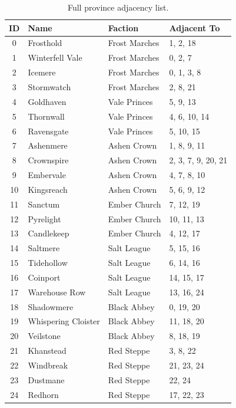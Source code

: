 \documentclass[a4paper, 11pt]{article}
\begin{document}
\begin{table}[htbp]
\centering
\caption{Full province adjacency list.}
\label{tab:adjacency}
\small
\begin{tabular}{@{}clll@{}}
\toprule
\textbf{ID} & \textbf{Name} & \textbf{Faction} & \textbf{Adjacent To} \\
\midrule
0  & Frosthold          & Frost Marches & 1, 2, 18 \\
1  & Winterfell Vale    & Frost Marches & 0, 2, 7 \\
2  & Icemere            & Frost Marches & 0, 1, 3, 8 \\
3  & Stormwatch         & Frost Marches & 2, 8, 21 \\
4  & Goldhaven          & Vale Princes  & 5, 9, 13 \\
5  & Thornwall          & Vale Princes  & 4, 6, 10, 14 \\
6  & Ravensgate         & Vale Princes  & 5, 10, 15 \\
7  & Ashenmere          & Ashen Crown   & 1, 8, 9, 11 \\
8  & Crownspire         & Ashen Crown   & 2, 3, 7, 9, 20, 21 \\
9  & Embervale          & Ashen Crown   & 4, 7, 8, 10 \\
10 & Kingsreach         & Ashen Crown   & 5, 6, 9, 12 \\
11 & Sanctum            & Ember Church  & 7, 12, 19 \\
12 & Pyrelight          & Ember Church  & 10, 11, 13 \\
13 & Candlekeep         & Ember Church  & 4, 12, 17 \\
14 & Saltmere           & Salt League   & 5, 15, 16 \\
15 & Tidehollow         & Salt League   & 6, 14, 16 \\
16 & Coinport           & Salt League   & 14, 15, 17 \\
17 & Warehouse Row      & Salt League   & 13, 16, 24 \\
18 & Shadowmere         & Black Abbey   & 0, 19, 20 \\
19 & Whispering Cloister & Black Abbey  & 11, 18, 20 \\
20 & Veilstone          & Black Abbey   & 8, 18, 19 \\
21 & Khanstead          & Red Steppe    & 3, 8, 22 \\
22 & Windbreak          & Red Steppe    & 21, 23, 24 \\
23 & Dustmane           & Red Steppe    & 22, 24 \\
24 & Redhorn            & Red Steppe    & 17, 22, 23 \\
\bottomrule
\end{tabular}
\end{table}
\end{document}
